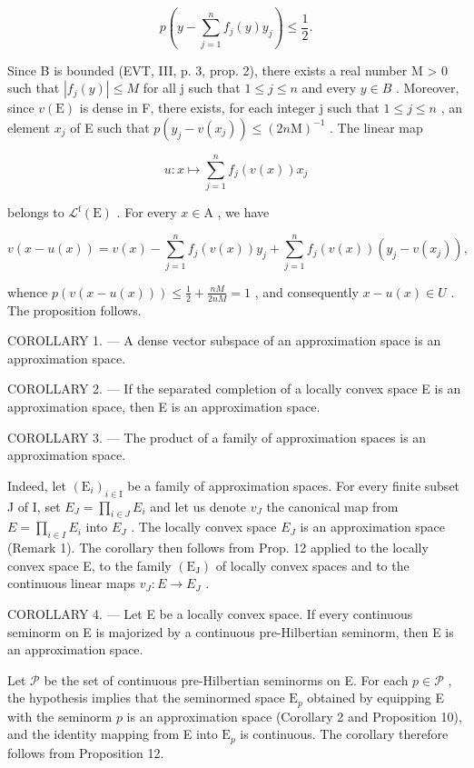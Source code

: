 \[
p \left(y - \sum_ {j = 1} ^ {n} f _ {j} (y) y _ {j}\right) \leqslant \frac {1}{2}.
\]

Since B is bounded (EVT, III, p. 3, prop. 2), there exists a real number M > 0 such that \(|f_{j}(y)| \leqslant M\) for all j such that \(1 \leqslant j \leqslant n\) and every \(y \in B\) . Moreover, since \(v(\mathrm{E})\) is dense in F, there exists, for each integer j such that \(1 \leqslant j \leqslant n\) , an element \(x_{j}\) of E such that \(p(y_{j} - v(x_{j})) \leqslant (2n\mathrm{M})^{-1}\) . The linear map

\[
u \colon x \longmapsto \sum_ {j = 1} ^ {n} f _ {j} (v (x)) x _ {j}
\]

belongs to \(\mathcal{L}^{\mathrm{f}}(\mathrm{E})\) . For every \(x\in \mathrm{A}\) , we have

\[
v (x - u (x)) = v (x) - \sum_ {j = 1} ^ {n} f _ {j} (v (x)) y _ {j} + \sum_ {j = 1} ^ {n} f _ {j} (v (x)) \left(y _ {j} - v \left(x _ {j}\right)\right),
\]

whence \(p(v(x - u(x))) \leqslant \frac{1}{2} + \frac{nM}{2nM} = 1\) , and consequently \(x - u(x) \in U\) . The proposition follows.

COROLLARY 1. --- A dense vector subspace of an approximation space is an approximation space.

COROLLARY 2. --- If the separated completion of a locally convex space E is an approximation space, then E is an approximation space.

COROLLARY 3. --- The product of a family of approximation spaces is an approximation space.

Indeed, let \((\mathrm{E}_{i})_{i\in\mathrm{I}}\) be a family of approximation spaces. For every finite subset J of I, set \(E_{J}=\prod_{i\in J}E_{i}\) and let us denote \(v_{J}\) the canonical map from \(E=\prod_{i\in I}E_{i}\) into \(E_{J}\) . The locally convex space \(E_{J}\) is an approximation space (Remark 1). The corollary then follows from Prop. 12 applied to the locally convex space E, to the family \((\mathrm{E}_{\mathrm{J}})\) of locally convex spaces and to the continuous linear maps \(v_{J}:E\to E_{J}\) .

COROLLARY 4. --- Let E be a locally convex space. If every continuous seminorm on E is majorized by a continuous pre-Hilbertian seminorm, then E is an approximation space.

Let \(\mathcal{P}\) be the set of continuous pre-Hilbertian seminorms on E. For each \(p \in \mathcal{P}\) , the hypothesis implies that the seminormed space \(\mathrm{E}_p\) obtained by equipping E with the seminorm \(p\) is an approximation space (Corollary 2 and Proposition 10), and the identity mapping from E into \(\mathrm{E}_p\) is continuous. The corollary therefore follows from Proposition 12.

